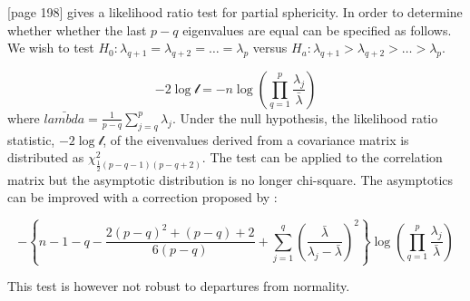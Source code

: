 \begin{definition}

[page 198] \cite{Seber:1984} gives a likelihood ratio test for partial sphericity.   In order to determine whether whether the last $p-q$ eigenvalues are equal can be specified as follows.   We wish to test $H_{0}: \lambda_{q+1} = \lambda_{q+2} = \ldots = \lambda_{p}$ versus $H_{a}: \lambda_{q+1} > \lambda_{q+2} > \ldots > \lambda_{p}$.

\begin{equation}
-2 \log \mathscr{l} = - n \log \left( \prod_{q=1}^{p} \frac{\lambda_{j}}{\bar{\lambda}} \right)
\end{equation}
where $\bar{lambda} = \frac{1}{p-q} \sum_{j=q}^{p} \lambda_{j}$.   Under the null hypothesis, the likelihood ratio statistic, $-2 \log \mathscr{l}$, of the eivenvalues derived from a covariance matrix is distributed as $\chi^{2}_{\frac{1}{2}(p-q-1)(p-q+2)}$.  The test can be applied to the correlation matrix but the asymptotic distribution is no longer chi-square.   The asymptotics can be improved with a correction proposed by \cite{Lawley:1956}:


\begin{equation}
- \left\{ n - 1 - q - \frac{2(p-q)^{2} + (p-q) + 2}{6(p-q)} + \sum_{j=1}^{q} \left(\frac{\bar{\lambda}}{\lambda_{j} - \bar{\lambda}} \right)^2 \right\}  \log \left( \prod_{q=1}^{p} \frac{\lambda_{j}}{\bar{\lambda}} \right)
\end{equation}

This test is however not robust to departures from normality.






\end{definition}